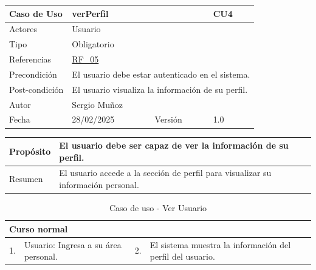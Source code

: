 \newpage

\begin{table}[H]
    \centering
    \begin{tabular}{| m{} | m{} | m{} | m{} |}
        \hline
        \rowcolor[HTML]{C0C0C0} Caso de Uso & \multicolumn{2}{|m{0.43\textwidth}|}{verPerfil} &  CU4\\ 
        \hline
        Actores & \multicolumn{3}{l|}{Usuario} \\ 
        \hline
        Tipo & \multicolumn{3}{l|}{Obligatorio} \\ 
        \hline
        Referencias & \multicolumn{3}{l|}{\hyperref[req:RF05]{RF\_05}} \\ 
        \hline
        Precondición & \multicolumn{3}{l|}{El usuario debe estar autenticado en el sistema.} \\ 
        \hline
        Post-condición & \multicolumn{3}{l|}{El usuario visualiza la información de su perfil.} \\ 
        \hline
        Autor & \multicolumn{3}{l|}{Sergio Muñoz} \\ 
        \hline
        Fecha & 28/02/2025 & Versión & 1.0 \\ 
        \hline
    \end{tabular}
\end{table}

\begin{table}[H]
    \centering
    \begin{tabular}{| m{} | m{} | m{} | m{} |}
        \hline
        Propósito & \multicolumn{3}{m{0.67\textwidth}|}{El usuario debe ser capaz de ver la información de su perfil.} \\ 
        \hline
        Resumen & \multicolumn{3}{m{0.67\textwidth}|}{El usuario accede a la sección de perfil para visualizar su información personal.} \\ 
        \hline
    \end{tabular}
\end{table}

\begin{table}[H]
    \centering
    \begin{tabular}{| m{} | m{} | m{} | m{} |}
        \hline
        \multicolumn{4}{|m{0.9\textwidth}|}{Curso normal} \\ 
        \hline
        1. & Usuario: Ingresa a su área personal. 
        & 2. & El sistema muestra la información del perfil del usuario. \\ 
        \hline
    \end{tabular}
    \caption{Caso de uso - Ver Usuario}
\end{table}


